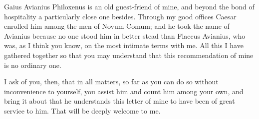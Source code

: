 

 Gaius Avianius Philoxenus is an old guest-friend of mine, and beyond the bond of hospitality a particularly close one besides. Through my good offices Caesar enrolled him among the men of Novum Comum; and he took the name of Avianius because no one stood him in better stead than Flaccus Avianius, who was, as I think you know, on the most intimate terms with me. All this I have gathered together so that you may understand that this recommendation of mine is no ordinary one.

 I ask of you, then, that in all matters, so far as you can do so without inconvenience to yourself, you assist him and count him among your own, and bring it about that he understands this letter of mine to have been of great service to him. That will be deeply welcome to me.
